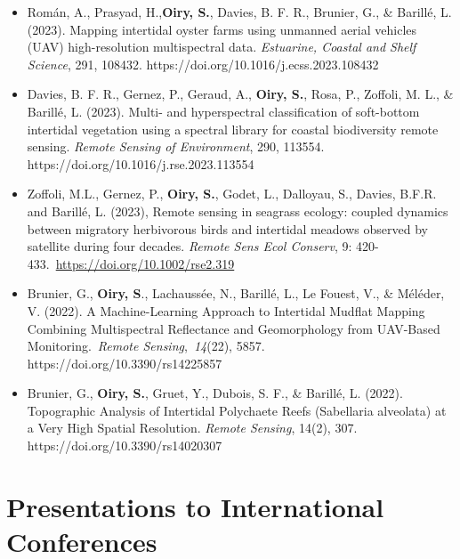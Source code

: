 \documentclass[
  letterpaper,
  11pt,
  english,
  singlespacing,
  headsepline]{MastersDoctoralThesis}
\begin{document}
\begin{itemize}
\item
  Román, A., Prasyad, H.,\textbf{Oiry, S.}, Davies, B. F. R., Brunier,
  G., \& Barillé, L. (2023). Mapping intertidal oyster farms using
  unmanned aerial vehicles (UAV) high-resolution multispectral data.
  \emph{Estuarine, Coastal and Shelf Science}, 291, 108432.
  https://doi.org/10.1016/j.ecss.2023.108432
\item
  Davies, B. F. R., Gernez, P., Geraud, A., \textbf{Oiry, S.}, Rosa, P.,
  Zoffoli, M. L., \& Barillé, L. (2023). Multi- and hyperspectral
  classification of soft-bottom intertidal vegetation using a spectral
  library for coastal biodiversity remote sensing. \emph{Remote Sensing
  of Environment}, 290, 113554.
  https://doi.org/10.1016/j.rse.2023.113554
\item
  Zoffoli, M.L., Gernez, P., \textbf{Oiry, S.}, Godet, L., Dalloyau, S.,
  Davies, B.F.R. and Barillé, L. (2023), Remote sensing in seagrass
  ecology: coupled dynamics between migratory herbivorous birds and
  intertidal meadows observed by satellite during four decades.
  \emph{Remote Sens Ecol Conserv}, 9:
  420-433.~\url{https://doi.org/10.1002/rse2.319}
\item
  Brunier, G., \textbf{Oiry, S}., Lachaussée, N., Barillé, L., Le
  Fouest, V., \& Méléder, V. (2022). A Machine-Learning Approach to
  Intertidal Mudflat Mapping Combining Multispectral Reflectance and
  Geomorphology from UAV-Based Monitoring.~\emph{Remote
  Sensing},~\emph{14}(22), 5857. https://doi.org/10.3390/rs14225857
\item
  Brunier, G., \textbf{Oiry, S.}, Gruet, Y., Dubois, S. F., \& Barillé,
  L. (2022). Topographic Analysis of Intertidal Polychaete Reefs
  (Sabellaria alveolata) at a Very High Spatial Resolution. \emph{Remote
  Sensing}, 14(2), 307. https://doi.org/10.3390/rs14020307
\end{itemize}

\section*{Presentations to International
Conferences}\label{presentations-to-international-conferences}

\end{document}
